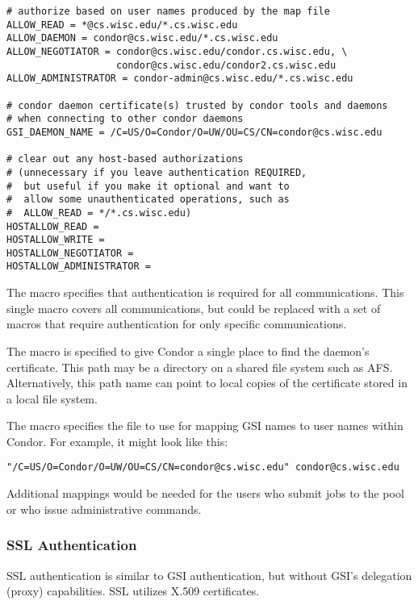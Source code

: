 \begin{description}
\begin{verbatim}
# authorize based on user names produced by the map file
ALLOW_READ = *@cs.wisc.edu/*.cs.wisc.edu
ALLOW_DAEMON = condor@cs.wisc.edu/*.cs.wisc.edu
ALLOW_NEGOTIATOR = condor@cs.wisc.edu/condor.cs.wisc.edu, \
                   condor@cs.wisc.edu/condor2.cs.wisc.edu
ALLOW_ADMINISTRATOR = condor-admin@cs.wisc.edu/*.cs.wisc.edu

# condor daemon certificate(s) trusted by condor tools and daemons
# when connecting to other condor daemons
GSI_DAEMON_NAME = /C=US/O=Condor/O=UW/OU=CS/CN=condor@cs.wisc.edu

# clear out any host-based authorizations
# (unnecessary if you leave authentication REQUIRED,
#  but useful if you make it optional and want to
#  allow some unauthenticated operations, such as
#  ALLOW_READ = */*.cs.wisc.edu)
HOSTALLOW_READ =
HOSTALLOW_WRITE =
HOSTALLOW_NEGOTIATOR =
HOSTALLOW_ADMINISTRATOR =
\end{verbatim}
\normalsize

The
 macro specifies that
authentication is required for all communications.
This single macro covers all communications, but could be
replaced with a set of macros that require authentication for
only specific communications.

The macro  is specified
to give
Condor a single place to find the daemon's certificate.
This path may be a directory on a shared file system such as AFS. 
Alternatively, this path name can point to 
local copies of the certificate stored
in a local file system.

The macro  specifies the file
to use for mapping GSI names to user names within Condor.  For example,
it might look like this:

\footnotesize
\begin{verbatim}
"/C=US/O=Condor/O=UW/OU=CS/CN=condor@cs.wisc.edu" condor@cs.wisc.edu
\end{verbatim}
\normalsize

Additional mappings would be needed for the users who submit jobs to
the pool or who issue administrative commands.

\end{description}

\subsubsection{\label{sec:SSL-Authentication}SSL Authentication}
\index{authentication!SSL}
SSL authentication is similar to GSI authentication,
but without GSI's delegation (proxy) capabilities.
SSL utilizes X.509 certificates.

